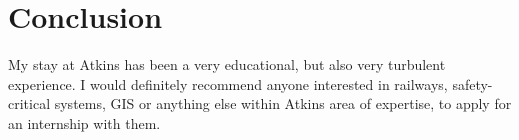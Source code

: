 \documentclass[11pt,a4paper,UKenglish]{article}
\begin{document}
\section{Conclusion}
My stay at Atkins has been a very educational, but also very turbulent experience. I would definitely recommend anyone interested in railways, safety-critical systems, GIS  or anything else within Atkins area of expertise, to  apply for an internship with them.




\appendix %



\end{document}
